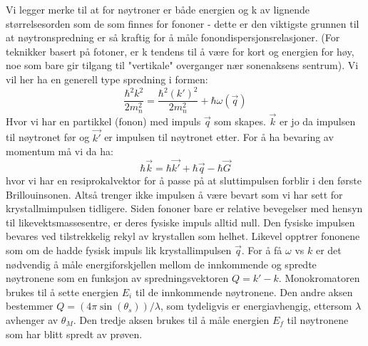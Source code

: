 \documentclass{article}
\begin{document}
Vi legger merke til at for nøytroner er både energien og k av lignende størrelsesorden som de som finnes for fononer - dette er den viktigste grunnen til at nøytronspredning er så kraftig for å måle fonondispersjonsrelasjoner. (For teknikker basert på fotoner, er k tendens til å være for kort og energien for høy, noe som bare gir tilgang til "vertikale" overganger nær sonenaksens sentrum).
Vi vil her ha en generell type spredning i formen:
\begin{equation}
    \frac{\hbar^2 k^2}{2m_n^2} = \frac{\hbar^2 (k')^2}{2m_n^2} + \hbar\omega(\vec{q})
\end{equation}
Hvor vi har en partikkel (fonon) med impuls $\vec{q}$ som skapes. $\vec{k}$ er jo da impulsen til nøytronet før og $\vec{k'}$ er impulsen til nøytronet etter. For å ha bevaring av momentum må vi da ha:
\begin{equation}
    \hbar \vec{k} = \hbar \vec{k'} + \hbar \vec{q} - \hbar \vec{G}
\end{equation}
hvor vi har en resiprokalvektor for å passe på at sluttimpulsen forblir i den første Brillouinsonen. Altså trenger ikke impulsen å være bevart som vi har sett for krystallmimpulsen tidligere.
Siden fononer bare er relative bevegelser med hensyn til likevektsmassesentre, er deres fysiske impuls alltid null. Den fysiske impulsen bevares ved tilstrekkelig rekyl av krystallen som helhet. Likevel opptrer fononene som om de hadde fysisk impuls lik krystallimpulsen $\vec{q}$.
For å få $\omega$ vs $k$ er det nødvendig å måle energiforskjellen mellom de innkommende og spredte nøytronene som en funksjon av spredningsvektoren $Q = k' - k$. Monokromatoren brukes til å sette energien $E_i$ til de innkommende nøytronene. Den andre aksen bestemmer $Q = (4\pi \sin(\theta_s))/\lambda$, som tydeligvis er energiavhengig, ettersom $\lambda$ avhenger av $\theta_M$. Den tredje aksen brukes til å måle energien $E_f$ til nøytronene som har blitt spredt av prøven.
\end{document}
